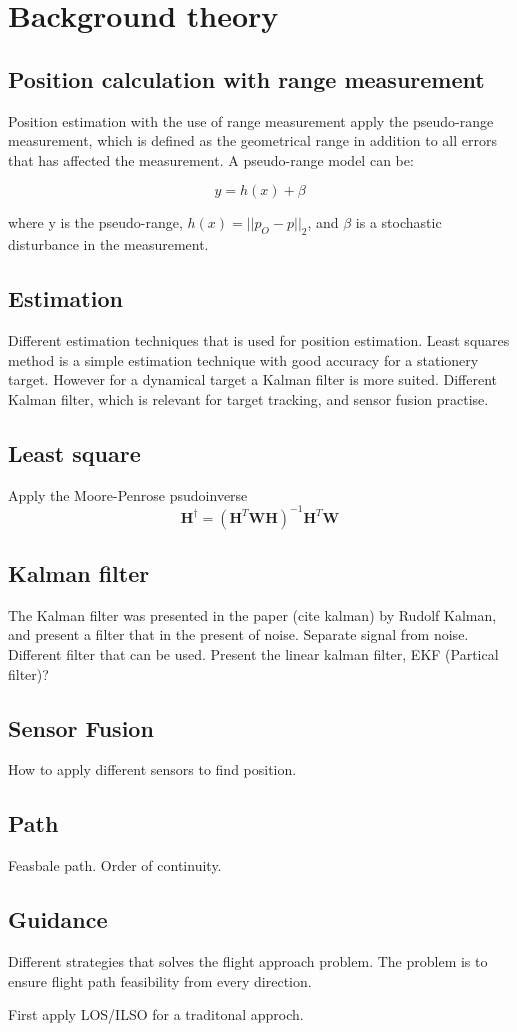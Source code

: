 \chapter{Background theory}
\section{Position calculation with range measurement}

Position estimation with the use of range measurement apply the pseudo-range measurement, which is defined as the geometrical range in addition to all errors that has affected the measurement. A pseudo-range model can be:

\begin{equation}
y = h(x) + \beta
\end{equation}

where y is the pseudo-range, $h(x) = ||p_O - p||_2$, and $\beta$ is a stochastic disturbance in the measurement.

\section{Estimation}
Different estimation techniques that is used for position estimation. Least squares method is a simple estimation technique with good accuracy for a stationery target. However for a dynamical target a Kalman filter is more suited. Different Kalman filter, which is relevant for target tracking, and sensor fusion practise.

\section{Least square}
Apply the Moore-Penrose psudoinverse
\begin{equation}
\textbf{H}^{\dagger} = (\textbf{H}^T\textbf{W}\textbf{H})^{-1}\textbf{H}^T\textbf{W}
\end{equation}

\section{Kalman filter}
The Kalman filter was presented in the paper (cite kalman) by Rudolf Kalman, and present a filter that in the present of noise. Separate signal from noise.
Different filter that can be used. Present the linear kalman filter, EKF (Partical filter)?

\section{Sensor Fusion}
How to apply different sensors to find position.
\section{Path}
Feasbale path. Order of continuity.
\section{Guidance}
Different strategies that solves the flight approach problem. The problem is to ensure flight path feasibility from every direction.

First apply LOS/ILSO for a traditonal approch. 